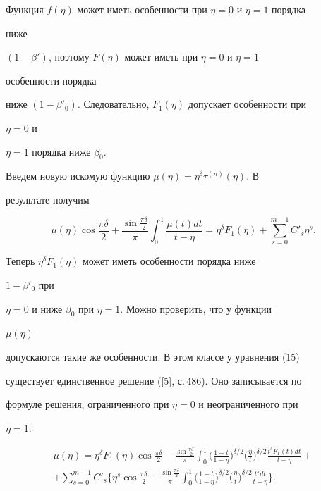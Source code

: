 Функция $f(\eta)$ может иметь особенности при $\eta=0$ и $\eta=1$ порядка 


ниже 


$(1-\beta')$, поэтому $F(\eta)$ может иметь при $\eta=0$ и $\eta=1$ 


особенности порядка 


ниже $(1-\beta'_0)$. Следовательно, $F_1(\eta)$ допускает особенности при 


$\eta=0$ и 


$\eta=1$ порядка ниже $\beta_0$. 


 


Введем новую искомую функцию $\mu(\eta)=\eta^\delta\tau^{(n)}(\eta)$. В 


результате получим 


\begin{equation} 


\mu(\eta)\cos\frac{\pi\delta}{2}+ 


\frac{\sin\frac{\pi\delta}{2}}{\pi}\int^1_0 


\frac{\mu(t)dt}{t-\eta}=\eta^\delta F_1(\eta)+\sum^{m-1}_{s=0} 


C'_s \eta^s. 


\end{equation} 


Теперь $\eta^\delta F_1(\eta)$ может иметь особенности порядка ниже 


$1-\beta'_0$ при 


$\eta=0$ и ниже $\beta_0$ при $\eta=1$. Можно проверить, что у функции 


$\mu(\eta)$ 


допускаются такие же особенности. В этом классе у уравнения (15) 


существует единственное решение ([5], с.\,486). Оно записывается по 


формуле решения, ограниченного при $\eta=0$ и неограниченного при 


$\eta=1$: 


\begin{multline*} 


\mu(\eta)=\eta^\delta F_1(\eta)\cos\frac{\pi\delta}{2}- 


\frac{\sin\frac{\pi\delta}{2}}{\pi}\int^1_0 


\bigg(\frac{1-t}{1-\eta} \bigg)^{\delta/2} 


\bigg(\frac{\eta}{t} \bigg)^{\delta/2} 


\frac{t^\delta F_1(t)dt}{t-\eta} + \\ 


% 


+\sum^{m-1}_{s=0}C'_s\bigg\{\eta^s\cos\frac{\pi\delta}{2}- 


\frac{\sin\frac{\pi\delta}{2}}{\pi}\int^1_0 


\bigg(\frac{1-t}{1-\eta} \bigg)^{\delta/2} 


\bigg(\frac{\eta}{t} \bigg)^{\delta/2} 


\frac{t^s dt}{t-\eta}\bigg\}. 


\end{multline*} 


